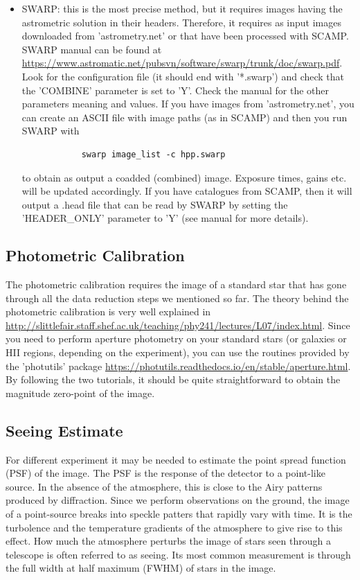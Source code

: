 \documentclass[a4paper, 11pt, fleqn]{memoir}
\begin{document}
\begin{itemize}
    \item
          SWARP: this is the most precise method, but it requires images having the
          astrometric solution in their headers.
          Therefore, it requires as input images downloaded from 'astrometry.net' or that have been processed with SCAMP.
          SWARP manual can be found at \url{https://www.astromatic.net/pubsvn/software/swarp/trunk/doc/swarp.pdf}.
          Look for the configuration file (it should end with '*.swarp') and check that the 'COMBINE' parameter is set to 'Y'.
          Check the manual for the other parameters meaning and values.
          If you have images from 'astrometry.net', you can create an ASCII file with image paths (as in SCAMP) and then you run SWARP with
          \begin{verbatim}
            swarp image_list -c hpp.swarp
          \end{verbatim}
          to obtain as output a coadded (combined) image.
          Exposure times, gains etc. will be updated accordingly.
          If you have catalogues from SCAMP, then it will output a .head file that can be read by SWARP by setting the 'HEADER\_ONLY' parameter to 'Y' (see manual for more details).
\end{itemize}

\subsection{Photometric Calibration}

The photometric calibration requires the image of a standard star that has gone through all the data reduction steps we mentioned so far.
The theory behind the photometric calibration is very well explained in \url{http://slittlefair.staff.shef.ac.uk/teaching/phy241/lectures/L07/index.html}.
Since you need to perform aperture photometry on your standard stars (or galaxies or HII regions, depending on the experiment), you can use the routines provided by the 'photutils'  package \url{https://photutils.readthedocs.io/en/stable/aperture.html}.
By following the two tutorials, it should be quite straightforward to obtain the magnitude zero-point of the image.

\subsection{Seeing Estimate}

For different experiment it may be needed to estimate the point spread function (PSF) of the image.
The PSF is the response of the detector to a point-like source.
In the absence of the atmosphere, this is close to the Airy patterns produced by diffraction.
Since we perform observations on the ground, the image of a point-source breaks into speckle patters that rapidly vary with time.
It is the turbolence and the temperature gradients of the atmosphere to give rise to this effect.
How much the atmosphere perturbs the image of stars seen through a telescope is often referred to as seeing.
Its most common measurement is through the full width at half maximum (FWHM) of stars in the image.
\end{document}
